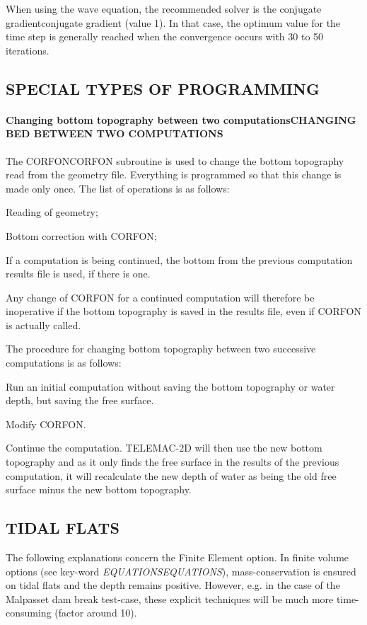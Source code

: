 \documentclass{article} %
\begin{document}
 When using the wave equation, the recommended solver is the conjugate gradientconjugate gradient (value 1). In that case, the optimum value for the time step is generally reached when the convergence occurs with 30 to 50 iterations.


\subsection{ SPECIAL TYPES OF PROGRAMMING}


\paragraph{ Changing bottom topography between two computationsCHANGING BED BETWEEN TWO COMPUTATIONS}

 The CORFONCORFON subroutine is used to change the bottom topography read from the geometry file. Everything is programmed so that this change is made only once. The list of operations is as follows:

 Reading of geometry;

 Bottom correction with CORFON;

 If a computation is being continued, the bottom from the previous computation results file is used, if there is one.

 Any change of CORFON for a continued computation will therefore be inoperative if the bottom topography is saved in the results file, even if CORFON is actually called.

 The procedure for changing bottom topography between two successive computations is as follows:

 Run an initial computation without saving the bottom topography or water depth, but saving the free surface.

 Modify CORFON.

 Continue the computation. TELEMAC-2D will then use the new bottom topography and as it only finds the free surface in the results of the previous computation, it will recalculate the new depth of water as being the old free surface minus the new bottom topography.




\subsection{  TIDAL FLATS}

 The following explanations concern the Finite Element option. In finite volume options (see key-word \textit{EQUATIONSEQUATIONS}), mass-conservation is ensured on tidal flats and the depth remains positive. However, e.g. in the case of the Malpasset dam break test-case, these explicit techniques will be much more time-consuming (factor around 10).
\end{document}

